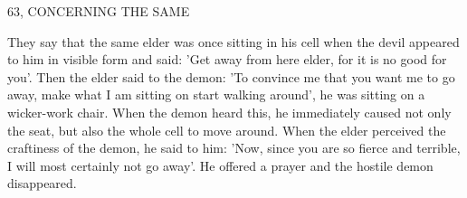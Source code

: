 63, CONCERNING THE SAME

They say that the same elder was once sitting in his cell when the
devil appeared to him in visible form and said: 'Get away from here
elder, for it is no good for you'.
Then the elder said to the demon:
'To convince me that you want me to go away, make what I am
sitting on start walking around', he was sitting on a wicker-work
chair.
When the demon heard this, he immediately caused not only
the seat, but also the whole cell to move around.
When the elder
perceived the craftiness of the demon, he said to him: 'Now, since
you are so fierce and terrible, I will most certainly not go away'.
He
offered a prayer and the hostile demon disappeared.

